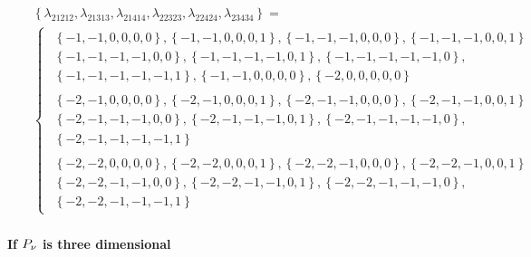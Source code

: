 \documentclass[12pt]{article}
\begin{document}
\begin{eqnarray*}
&&\left\{ \lambda _{21212},\lambda _{21313},\lambda _{21414},\lambda
_{22323},\lambda _{22424},\lambda _{23434}\right\} = \\
&&\left\{ 
\begin{array}{c}
\begin{array}{c}
\left\{ -1,-1,0,0,0,0\right\} ,\left\{ -1,-1,0,0,0,1\right\} ,\left\{
-1,-1,-1,0,0,0\right\} ,\left\{ -1,-1,-1,0,0,1\right\} \\ 
\left\{ -1,-1,-1,-1,0,0\right\} ,\left\{ -1,-1,-1,-1,0,1\right\} ,\left\{
-1,-1,-1,-1,-1,0\right\} , \\ 
\left\{ -1,-1,-1,-1,-1,1\right\} ,\left\{ -1,-1,0,0,0,0\right\} ,\left\{
-2,0,0,0,0,0\right\}%
\end{array}
\\ 
\begin{array}{c}
\left\{ -2,-1,0,0,0,0\right\} ,\left\{ -2,-1,0,0,0,1\right\} ,\left\{
-2,-1,-1,0,0,0\right\} ,\left\{ -2,-1,-1,0,0,1\right\} \\ 
\left\{ -2,-1,-1,-1,0,0\right\} ,\left\{ -2,-1,-1,-1,0,1\right\} ,\left\{
-2,-1,-1,-1,-1,0\right\} , \\ 
\left\{ -2,-1,-1,-1,-1,1\right\}%
\end{array}
\\ 
\begin{array}{c}
\left\{ -2,-2,0,0,0,0\right\} ,\left\{ -2,-2,0,0,0,1\right\} ,\left\{
-2,-2,-1,0,0,0\right\} ,\left\{ -2,-2,-1,0,0,1\right\} \\ 
\left\{ -2,-2,-1,-1,0,0\right\} ,\left\{ -2,-2,-1,-1,0,1\right\} ,\left\{
-2,-2,-1,-1,-1,0\right\} , \\ 
\left\{ -2,-2,-1,-1,-1,1\right\}%
\end{array}%
\end{array}%
\right.
\end{eqnarray*}

\paragraph{If $P_{\mathcal{\protect\nu }}$ is three dimensional}
\end{document}
